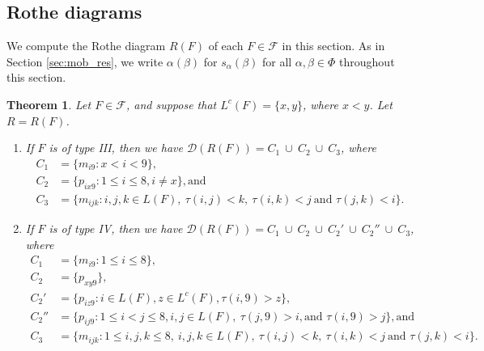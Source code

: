\documentclass[10pt,a4paper]{amsart}
\newtheorem{theorem}{Theorem}[section]
\numberwithin{equation}{section}
\newcommand{\al}{\alpha}
\newcommand{\be}{\beta}
\newcommand{\res}{\mathscr{D}}
\newcommand{\lc}{L^c}
\newcommand{\calf}{\mathcal{F}}
\newcommand{\mr}{m}
\newcommand{\pr}{p}
\begin{document}
\subsection{Rothe diagrams}
\label{sec:fob_res}
We compute the Rothe diagram $R(F)$ of each $F\in \calf$ in this section. As in
Section \ref{sec:mob_res}, we write $\al(\be)$ for $s_\al(\be)$ for all
$\al,\be\in \Phi$ throughout this section. 


\begin{theorem}
\label{thm:fob_res}
Let $F\in \calf$, and suppose that $\lc(F)=\{x,y\}$, where $x<y$. Let $R=R(F)$.
\begin{enumerate}
\item If $F$ is of type III, then we have 
$\res(R(F)) = C_1 \ \cup\ C_2 \ \cup\ C_3$, where 
\begin{align*}
C_1 &= \{\mr_{i9} : x < i < 9\},\\
C_2 &= \{\pr_{ix9} : 1\le i\le 8, i\neq x\},
\text{and}\\ 
C_3 &= \{\mr_{ijk} : i, j, k \in L(F), \ \tau(i, j)<k, \ \tau(i, k)<j\ 
\text{and\ } \tau(j, k)<i\}.
\end{align*}
\item If $F$ is of type IV, then we have $\res(R(F)) = C_1 \ \cup\ C_2
  \ \cup\ C_2'\ \cup\ C_2''\ \cup\ C_3$, where 
  \begin{align*}
C_1 &= \{\mr_{i9} : 1 \leq i \le 8\},\\
C_2 &= \{p_{xy9}\}, \\
C_2' & = \{p_{iz9}: i\in L(F), z\in \lc(F), \tau(i,9)>z\},\\
C_2'' &=\{
  \pr_{ij9} : 1 \leq i < j \leq 8, i,j\in L(F), \ \tau(j, 9)>i, \text{and } \tau(i,
9)>j\}, \text{and}\\ 
C_3 &= \{\mr_{ijk} : 1\le i,j,k\le 8,\ i,j,k\in L(F), \ \tau(i, j)<k, \
  \tau(i, k)<j\ 
\text{and\ } \tau(j, k)<i\}.
\end{align*}
\end{enumerate}
\end{theorem}
\end{document}
